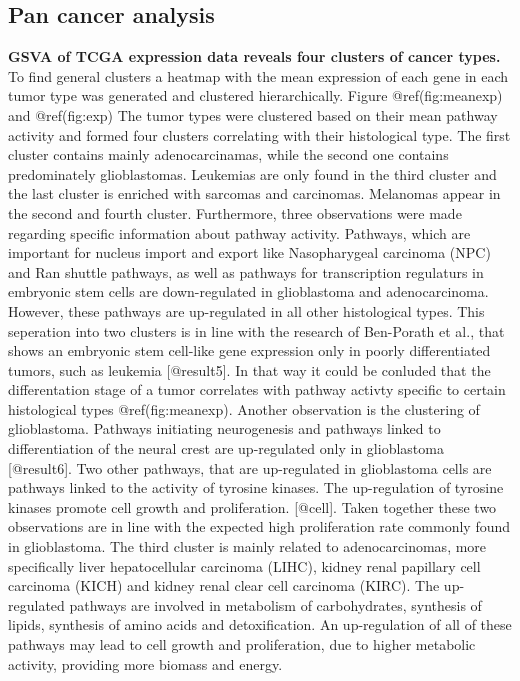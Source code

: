 \documentclass[
]{article}
\begin{document}
\hypertarget{pan-cancer-analysis}{%
\subsection{Pan cancer analysis}\label{pan-cancer-analysis}}

\textbf{GSVA of TCGA expression data reveals four clusters of cancer
types.} To find general clusters a heatmap with the mean expression of
each gene in each tumor type was generated and clustered hierarchically.
Figure @ref(fig:meanexp) and @ref(fig:exp) The tumor types were
clustered based on their mean pathway activity and formed four clusters
correlating with their histological type. The first cluster contains
mainly adenocarcinamas, while the second one contains predominately
glioblastomas. Leukemias are only found in the third cluster and the
last cluster is enriched with sarcomas and carcinomas. Melanomas appear
in the second and fourth cluster. Furthermore, three observations were
made regarding specific information about pathway activity. Pathways,
which are important for nucleus import and export like Nasopharygeal
carcinoma (NPC) and Ran shuttle pathways, as well as pathways for
transcription regulaturs in embryonic stem cells are down-regulated in
glioblastoma and adenocarcinoma. However, these pathways are
up-regulated in all other histological types. This seperation into two
clusters is in line with the research of Ben-Porath et al., that shows
an embryonic stem cell-like gene expression only in poorly
differentiated tumors, such as leukemia {[}@result5{]}. In that way it
could be conluded that the differentation stage of a tumor correlates
with pathway activty specific to certain histological types
@ref(fig:meanexp). Another observation is the clustering of
glioblastoma. Pathways initiating neurogenesis and pathways linked to
differentiation of the neural crest are up-regulated only in
glioblastoma {[}@result6{]}. Two other pathways, that are up-regulated
in glioblastoma cells are pathways linked to the activity of tyrosine
kinases. The up-regulation of tyrosine kinases promote cell growth and
proliferation. {[}@cell{]}. Taken together these two observations are in
line with the expected high proliferation rate commonly found in
glioblastoma. The third cluster is mainly related to adenocarcinomas,
more specifically liver hepatocellular carcinoma (LIHC), kidney renal
papillary cell carcinoma (KICH) and kidney renal clear cell carcinoma
(KIRC). The up-regulated pathways are involved in metabolism of
carbohydrates, synthesis of lipids, synthesis of amino acids and
detoxification. An up-regulation of all of these pathways may lead to
cell growth and proliferation, due to higher metabolic activity,
providing more biomass and energy.
\end{document}
